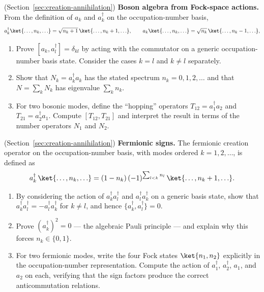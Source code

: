 \begin{problemset}
\item (Section~\ref{sec:creation-annihilation}) \textbf{Boson algebra from Fock-space actions.}
    From the definition of $a_k$ and $a_k^\dagger$ on the occupation-number basis,
    \begin{equation*}
        a_k^\dagger\ket{\ldots, n_k, \ldots} = \sqrt{n_k + 1}\,\ket{\ldots, n_k + 1, \ldots},
        \qquad
        a_k\ket{\ldots, n_k, \ldots} = \sqrt{n_k}\,\ket{\ldots, n_k - 1, \ldots},
    \end{equation*}
    \begin{enumerate}
        \item[(a)] Prove $[a_k, a_l^\dagger] = \delta_{kl}$ by acting with the commutator on a generic occupation-number basis state. Consider the cases $k = l$ and $k \neq l$ separately.
        \item[(b)] Show that $N_k = a_k^\dagger a_k$ has the stated spectrum $n_k = 0, 1, 2, \ldots$ and that $N = \sum_k N_k$ has eigenvalue $\sum_k n_k$.
        \item[(c)] For two bosonic modes, define the ``hopping'' operators $T_{12} = a_1^\dagger a_2$ and $T_{21} = a_2^\dagger a_1$. Compute $[T_{12}, T_{21}]$ and interpret the result in terms of the number operators $N_1$ and $N_2$.
    \end{enumerate}

\item (Section~\ref{sec:creation-annihilation}) \textbf{Fermionic signs.}
    The fermionic creation operator on the occupation-number basis, with modes ordered $k = 1, 2, \ldots$, is defined as
    \begin{equation*}
        a_k^\dagger\,\ket{\ldots, n_k, \ldots}
        = (1 - n_k)\,(-1)^{\sum_{l < k} n_l}\,\ket{\ldots, n_k + 1, \ldots}.
    \end{equation*}
    \begin{enumerate}
        \item[(a)] By considering the action of $a_k^\dagger a_l^\dagger$ and $a_l^\dagger a_k^\dagger$ on a generic basis state, show that $a_k^\dagger a_l^\dagger = -a_l^\dagger a_k^\dagger$ for $k \neq l$, and hence $\{a_k^\dagger, a_l^\dagger\} = 0$.
        \item[(b)] Prove $(a_k^\dagger)^2 = 0$ --- the algebraic Pauli principle --- and explain why this forces $n_k \in \{0, 1\}$.
        \item[(c)] For two fermionic modes, write the four Fock states $\ket{n_1, n_2}$ explicitly in the occupation-number representation. Compute the action of $a_1^\dagger$, $a_2^\dagger$, $a_1$, and $a_2$ on each, verifying that the sign factors produce the correct anticommutation relations.
    \end{enumerate}


\end{problemset}
